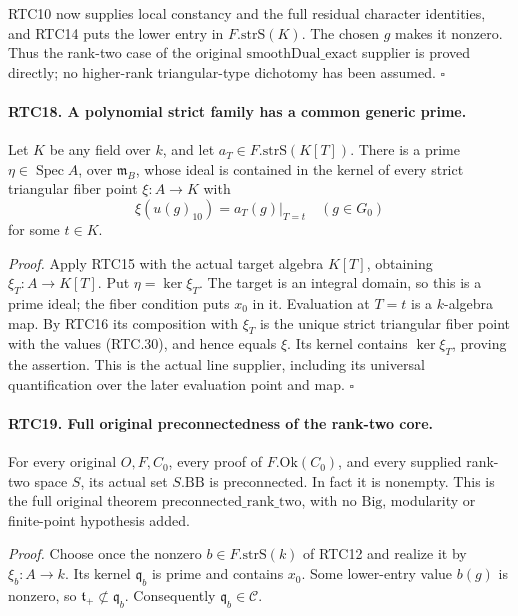 \documentclass[11pt,a4paper]{article}
\numberwithin{equation}{section}
\theoremstyle{remark}\newtheorem{remark}[theorem]{Remark}
\begin{document}
RTC10 now supplies local constancy and the full residual character
identities, and RTC14 puts the lower entry in
\(F.\mathrm{strS}(K)\).  The chosen \(g\) makes it nonzero.
Thus the rank-two case of the original
\(\mathrm{smoothDual\_\allowbreak exact}\) supplier is proved directly;
no higher-rank triangular-type dichotomy has been assumed.
\hfill\(\square\)

\paragraph{RTC18. A polynomial strict family has a common generic prime.}
\label{claim:RTC18}
Let \(K\) be any field over \(k\), and let
\(a_T\in F.\mathrm{strS}(K[T])\).  There is a prime
\(\eta\in\operatorname{Spec}A\), over \(\mathfrak m_B\),
whose ideal is contained in the kernel of every strict triangular
fiber point \(\xi:A\to K\) with
\[
 \xi(u(g)_{10})=a_T(g)|_{T=t}\quad(g\in G_0)
                                                        \tag{RTC.30}
\]
for some \(t\in K\).

\emph{Proof.}
Apply RTC15 with the actual target algebra \(K[T]\), obtaining
\(\xi_T:A\to K[T]\).  Put \(\eta=\ker\xi_T\).
The target is an integral domain, so this is a prime ideal;
the fiber condition puts \(x_0\) in it.  Evaluation at
\(T=t\) is a \(k\)-algebra map.  By RTC16 its composition
with \(\xi_T\) is the unique strict triangular fiber point
with the values (RTC.30), and hence equals \(\xi\).
Its kernel contains \(\ker\xi_T\), proving the assertion.
This is the actual \(\mathrm{line}\) supplier, including its
universal quantification over the later evaluation point and map.
\hfill\(\square\)

\paragraph{RTC19. Full original preconnectedness of the rank-two core.}
\label{claim:RTC19}
For every original \(O,F,C_0\), every proof of
\(F.\mathrm{Ok}(C_0)\), and every supplied rank-two space
\(S\), its actual set \(S.\mathrm{BB}\) is preconnected.
In fact it is nonempty.  This is the full original theorem
\(\mathrm{preconnected\_\allowbreak rank\_\allowbreak two}\), with no
\(\mathrm{Big}\), modularity or finite-point hypothesis added.

\emph{Proof.}
Choose once the nonzero \(b\in F.\mathrm{strS}(k)\) of
RTC12 and realize it by \(\xi_b:A\to k\).  Its kernel
\(\mathfrak q_b\) is prime and contains \(x_0\).
Some lower-entry value \(b(g)\) is nonzero, so
\(\mathfrak t_+\not\subset\mathfrak q_b\).
Consequently \(\mathfrak q_b\in\mathcal C\).
\end{document}
